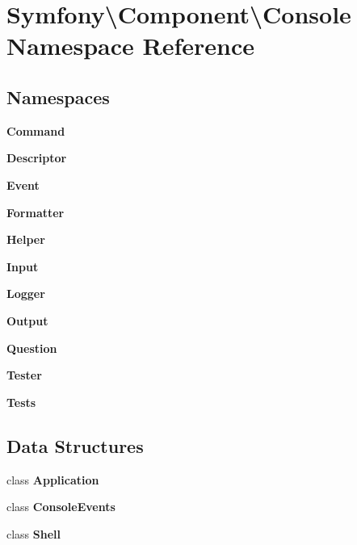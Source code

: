 \section{Symfony\textbackslash{}Component\textbackslash{}Console Namespace Reference}
\label{namespace_symfony_1_1_component_1_1_console}
\subsection*{Namespaces}
\begin{DoxyCompactItemize}
\item 
 {\bf Command}
\item 
 {\bf Descriptor}
\item 
 {\bf Event}
\item 
 {\bf Formatter}
\item 
 {\bf Helper}
\item 
 {\bf Input}
\item 
 {\bf Logger}
\item 
 {\bf Output}
\item 
 {\bf Question}
\item 
 {\bf Tester}
\item 
 {\bf Tests}
\end{DoxyCompactItemize}
\subsection*{Data Structures}
\begin{DoxyCompactItemize}
\item 
class {\bf Application}
\item 
class {\bf Console\+Events}
\item 
class {\bf Shell}
\end{DoxyCompactItemize}
